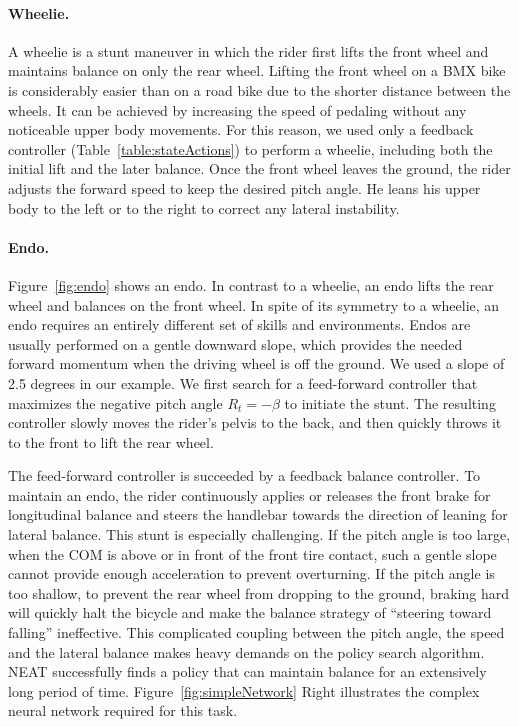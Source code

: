 \paragraph{Wheelie.} A wheelie is a stunt maneuver in which the rider first lifts the front wheel and maintains balance on only the rear wheel. Lifting the front wheel on a BMX bike is considerably easier than on a road bike due to the shorter distance between the wheels. It can be achieved by increasing the speed of pedaling without any noticeable upper body movements. For this reason, we used only a feedback controller (Table~\ref{table:stateActions}) to perform a wheelie, including both the initial lift and the later balance. Once the front wheel leaves the ground, the rider adjusts the forward speed to keep the desired pitch angle. He leans his upper body to the left or to the right to correct any lateral instability.

\paragraph{Endo.} Figure~\ref{fig:endo} shows an endo. In contrast to a wheelie, an endo lifts the rear wheel and balances on the front wheel. In spite of its symmetry to a wheelie, an endo requires an entirely different set of skills and environments. Endos are usually performed on a gentle downward slope, which provides the needed forward momentum when the driving wheel is off the ground. We used a slope of 2.5 degrees in our example. We first search for a feed-forward controller that maximizes the negative pitch angle $R_t = -\beta$ to initiate the stunt. The resulting controller slowly moves the rider's pelvis to the back, and then quickly throws it to the front to lift the rear wheel.

The feed-forward controller is succeeded by a feedback balance controller. To maintain an endo, the rider continuously applies or releases the front brake for longitudinal balance and steers the handlebar towards the direction of leaning for lateral balance. This stunt is especially challenging. If the pitch angle is too large, when the COM is above or in front of the front tire contact, such a gentle slope cannot provide enough acceleration to prevent overturning. If the pitch angle is too shallow, to prevent the rear wheel from dropping to the ground, braking hard will quickly halt the bicycle and make the balance strategy of ``steering toward falling'' ineffective. This complicated coupling between the pitch angle, the speed and the lateral balance makes heavy demands on the policy search algorithm. NEAT successfully finds a policy that can maintain balance for an extensively long period of time. Figure~\ref{fig:simpleNetwork} Right illustrates the complex neural network required for this task.

